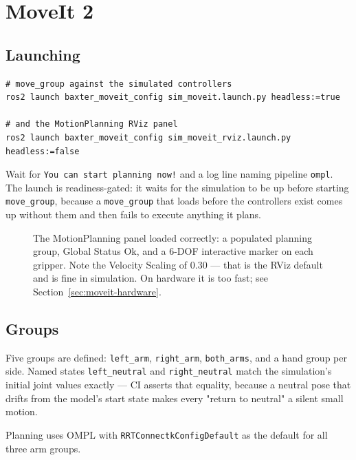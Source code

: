 \chapter{MoveIt 2}
\label{ch:moveit}

\section{Launching}

\begin{lstlisting}
# move_group against the simulated controllers
ros2 launch baxter_moveit_config sim_moveit.launch.py headless:=true

# and the MotionPlanning RViz panel
ros2 launch baxter_moveit_config sim_moveit_rviz.launch.py headless:=false
\end{lstlisting}

Wait for \texttt{You can start planning now!} and a log line naming pipeline
\texttt{ompl}. The launch is readiness-gated: it waits for the simulation to be
up before starting \texttt{move\_group}, because a \texttt{move\_group} that
loads before the controllers exist comes up without them and then fails to
execute anything it plans.

\begin{figure}[h]
\centering
{}
\caption{The MotionPlanning panel loaded correctly: a populated planning group,
Global Status Ok, and a 6-DOF interactive marker on each gripper. Note the
Velocity Scaling of 0.30 --- that is the RViz default and is fine in simulation.
On hardware it is too fast; see Section~\ref{sec:moveit-hardware}.}
\label{fig:moveitrviz}
\end{figure}

\section{Groups}

Five groups are defined: \texttt{left\_arm}, \texttt{right\_arm},
\texttt{both\_arms}, and a hand group per side. Named states
\texttt{left\_neutral} and \texttt{right\_neutral} match the simulation's initial
joint values exactly --- CI asserts that equality, because a neutral pose that
drifts from the model's start state makes every "return to neutral" a silent
small motion.

Planning uses OMPL with \texttt{RRTConnectkConfigDefault} as the default for all
three arm groups.

